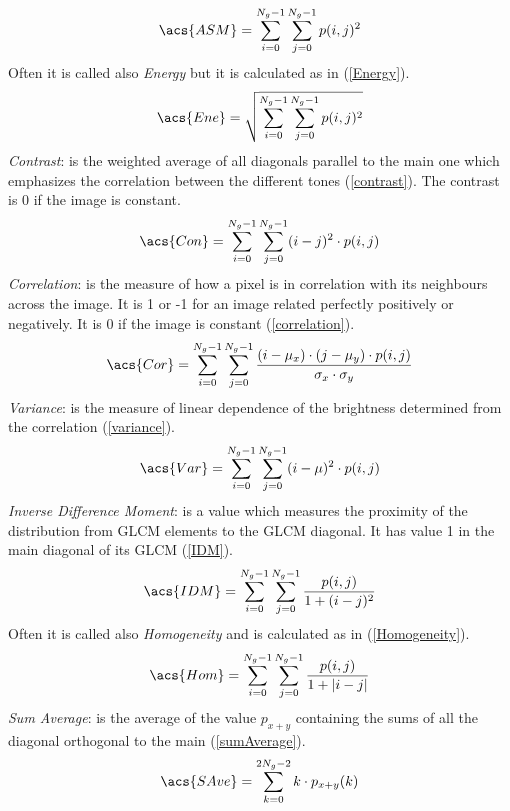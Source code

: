 \documentclass[final,a4paper,12pt,english]{UnicaPhdThesis3}
\begin{document}
\begin{equation}\label{asm}
\acs{ASM}=\sum_{i=0}^{N_{g}-1}\sum_{j=0}^{N_{g}-1}p(i,j)^2
\end{equation}
Often it is called also \textit{Energy} but it is calculated as in (\ref{Energy}).
\begin{equation}\label{Energy}
\acs{Ene}=\sqrt{\sum_{i=0}^{N_{g}-1}\sum_{j=0}^{N_{g}-1}p(i,j)^2}
\end{equation}
\textit{Contrast}: is the weighted average of all diagonals parallel to the main one which emphasizes the correlation between the different tones (\ref{contrast}). The contrast is 0 if the image is constant.
\begin{equation}\label{contrast}
\acs{Con}=\sum_{i=0}^{N_{g}-1}\sum_{j=0}^{N_{g}-1} (i-j)^2 \cdot p(i,j)
\end{equation}
\textit{Correlation}: is the measure of how a pixel is in correlation with its neighbours across the image. It is 1 or -1 for an image related perfectly positively or negatively. It is 0 if the image is constant (\ref{correlation}).
\begin{equation}\label{correlation}
\acs{Cor}=\sum_{i=0}^{N_{g}-1}\sum_{j=0}^{N_{g}-1}  \frac{(i-\mu_x) \cdot (j-\mu_y) \cdot p(i,j)}{\sigma_x \cdot \sigma_y}
\end{equation}
\textit{Variance}: is the measure of linear dependence of the brightness determined from the correlation (\ref{variance}).
\begin{equation}\label{variance}
\acs{Var}=\sum_{i=0}^{N_{g}-1}\sum_{j=0}^{N_{g}-1}(i-\mu)^2 \cdot p(i,j)
\end{equation}
\textit{Inverse Difference Moment}: is a value which measures the proximity of the distribution from GLCM elements to the GLCM diagonal. It has value 1 in the main diagonal of its GLCM (\ref{IDM}).
\begin{equation}\label{IDM}
\acs{IDM}=\sum_{i=0}^{N_{g}-1}\sum_{j=0}^{N_{g}-1}\frac{p(i,j)}{1 + (i-j)^2}
\end{equation}
Often it is called also \textit{Homogeneity} and is calculated as in (\ref{Homogeneity}).
\begin{equation}\label{Homogeneity}
\acs{Hom}=\sum_{i=0}^{N_{g}-1}\sum_{j=0}^{N_{g}-1}\frac{p(i,j)}{1 + |i-j|}
\end{equation}
\textit{Sum Average}: is the average of the value $p_{x+y}$ containing the sums of all the diagonal orthogonal to the main (\ref{sumAverage}).
\begin{equation}\label{sumAverage}
\acs{SAve}=\sum_{k=0}^{2N_{g}-2}k\cdot p_{x+y}(k)
\end{equation}
\end{document}
